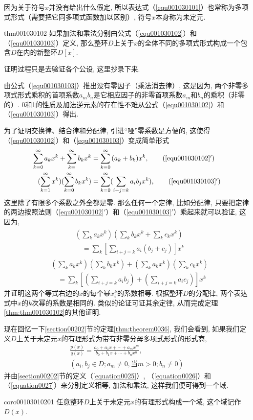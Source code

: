 因为关于符号$x$并没有给出什么假定, 所以表达式（\ref{equ001030101}）也常称为多项式形式（需要把它同多项式函数加以区别）, 符号$x$本身称为未定元. 

\begin{theorem}{}{thm001030102}
如果加法和乘法分别由公式（\ref{equ001030102}）和（\ref{equ001030103}）定义, 那么整环$D$上关于$x$的全体不同的多项式形式构成一个包含$D$在内的新整环$D[x]$. 
\end{theorem}

证明过程只是去验证各个公设, 这里抄录下来. 

由公式（\ref{equ001030103}）推出没有零因子（乘法消去律）, 这是因为, 两个非零多项式形式乘积的首项系数$a_mb_n$是它相应因子的非零首项系数$a_m$和$b_n$的乘积（非零的）. 0和1的性质及加法逆元素的存在性不难从公式（\ref{equ001030102}）和（\ref{equ001030103}）得出. 

为了证明交换律、结合律和分配律, 引进“哑”零系数是方便的, 这使得（\ref{equ001030102}）和（\ref{equ001030103}）变成简单形式
\begin{gather}
\begin{align}
\sum_{k=0}^{\infty}{a_kx^k}+\sum_{k=}^{\infty}{b_kx^k} &= \sum_{k=0}^{\infty}{(a_k+b_k)x^k}, \tag{\ref{equ001030102}$'$} \\
(\sum_{k=1}^{\infty}{x^k})(\sum_{k=0}^{\infty}{b_kx^k})&=\sum_{k=0}^{\infty}(\sum_{i+j=k}{a_ib_jx^k}), \tag{\ref{equ001030103}$'$}
\end{align}
\end{gather}
这里除了有限多个系数之外全都是零. 那么任何一个定律, 比如分配律, 只要把定律的两边按照法则（\ref{equ001030102}$'$）和（\ref{equ001030103}$'$）乘起来就可以验证, 这因为, 
\begin{gather*}
\begin{split}
&(\sum_{k}{a_kx^k})(\sum_{k}{b_kx^k}+\sum_{k}{c_kx^k})\\
&\quad =\sum_{k}{[\sum_{i+j=k}{a_i(b_j+c_j)}]x^k}
\end{split}
\end{gather*}
\[
\begin{split}
&(\sum_{k}{a_kx^k})(\sum_{k}{b_kx^k})+(\sum_{k}{a_kx^k})(\sum_{k}{c_kx^k})\\
&\quad =\sum_{k}{[(\sum_{i+j=k}{a_ib_j})+(\sum_{i+j=k}{a_ic_j})]x^k}
\end{split}
\]
并证明这两个等式右边的$x$的每个幂$x_i^k$的系数相等. 根据整环$D$的分配律, 两个表达式中$x$的$k$次幂的系数是相同的. 类似的论证可证其余定律, 从而完成定理\ref{thm:thm001030102}的其他证明. 

现在回忆一下\ref{section00202}节的定理\ref{thm:theorem0036}, 我们会看到, 如果我们定义$D$上关于未定元$x$的有理形式为带有非零分母多项式形式的形式商, 
\begin{gather*}
\frac{p(x)}{q(x)} = \frac{a_0+a_1x+\cdots+a_mx^m}{b_0+b_1x+\cdots+b_nx^n}, \\
(a_i, b_j \in D; a_m \neq 0, \text{当}m>0; b_n \neq 0)
\end{gather*}
并由\ref{section00202}节的定义（\ref{equation0025}）, （\ref{equation0026}）和（\ref{equation0027}）来分别定义相等, 加法和乘法, 这样我们便可得到一个域. 
\begin{corollary}{}{coro00103010201}
任意整环$D$上关于未定元$x$的有理形式构成一个域, 这个域记作$D(x)$. 
\end{corollary}

